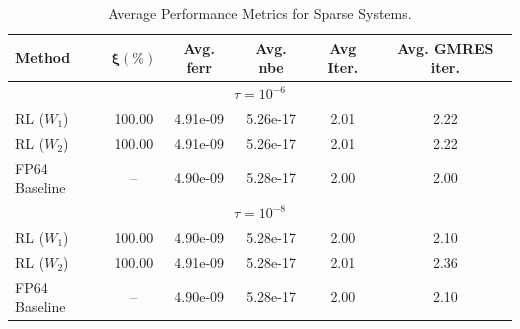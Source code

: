 \documentclass[Afour,sageh,times]{sagej}
\theoremstyle{plain}
\theoremstyle{definition}
\begin{document}
\begin{table}[h!]
\centering\scriptsize
\setlength{\tabcolsep}{7.5pt}
\renewcommand{\arraystretch}{1.15}

\caption{Average Performance Metrics for Sparse Systems.}
\label{tab:pm_ws_sparse}

\begin{tabular}{l
                S[table-format=3.2]
                S[table-format=1.2e-1]
                S[table-format=1.2e-1]
                S[table-format=1.2]
                S[table-format=1.2]}
\toprule
\textbf{Method}
& {$\boldsymbol{\xi(\%)}$}
& {\textbf{Avg. ferr}}
& {\textbf{Avg. nbe}}
& {\textbf{Avg Iter.}}
& {\textbf{Avg. GMRES iter.}}\\
\midrule

\\
\midrule
RL ($W_1$)       & 100.00 & 4.91e-09 & 5.26e-17 & 2.01 & 2.22 \\
RL ($W_2$)       & 100.00 & 4.91e-09 & 5.26e-17 & 2.01 & 2.22 \\
FP64 Baseline    & {--}   & 4.90e-09 & 5.28e-17 & 2.00 & 2.00 \\
\midrule[0.55pt]

\\
\midrule
RL ($W_1$)       & 100.00 & 4.90e-09 & 5.28e-17 & 2.00 & 2.10 \\
RL ($W_2$)       & 100.00 & 4.91e-09 & 5.28e-17 & 2.01 & 2.36 \\
FP64 Baseline    & {--}   & 4.90e-09 & 5.28e-17 & 2.00 & 2.10 \\
\bottomrule
\end{tabular}
\end{table}
\end{document}
